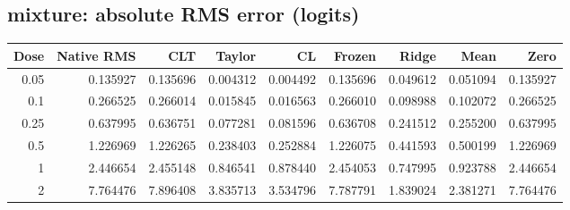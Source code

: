 \subsection{mixture: absolute RMS error (logits)}
\begin{center}\scriptsize
\begin{tabular}{rrrrrrrrr}
\toprule Dose & Native RMS & CLT & Taylor & CL & Frozen & Ridge & Mean & Zero\\\midrule
0.05 & 0.135927 & 0.135696 & 0.004312 & 0.004492 & 0.135696 & 0.049612 & 0.051094 & 0.135927\\
0.1 & 0.266525 & 0.266014 & 0.015845 & 0.016563 & 0.266010 & 0.098988 & 0.102072 & 0.266525\\
0.25 & 0.637995 & 0.636751 & 0.077281 & 0.081596 & 0.636708 & 0.241512 & 0.255200 & 0.637995\\
0.5 & 1.226969 & 1.226265 & 0.238403 & 0.252884 & 1.226075 & 0.441593 & 0.500199 & 1.226969\\
1 & 2.446654 & 2.455148 & 0.846541 & 0.878440 & 2.454053 & 0.747995 & 0.923788 & 2.446654\\
2 & 7.764476 & 7.896408 & 3.835713 & 3.534796 & 7.787791 & 1.839024 & 2.381271 & 7.764476\\
\bottomrule\end{tabular}\end{center}

